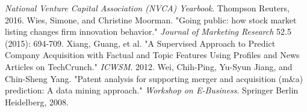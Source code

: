 \documentclass[12pt, a4paper]{article}
\begin{document}
\begin{thebibliography}{9}
 {\em National Venture Capital Association (NVCA) Yearbook}. Thompson Reuters, 2016.
 Wies, Simone, and Christine Moorman. {"Going public: how stock market listing changes firm innovation behavior."} {\em Journal of Marketing Research} 52.5 (2015): 694-709.
 Xiang, Guang, et al. {"A Supervised Approach to Predict Company Acquisition with Factual and Topic Features Using Profiles and News Articles on TechCrunch."} {\em ICWSM}. 2012.
 Wei, Chih-Ping, Yu-Syun Jiang, and Chin-Sheng Yang. {"Patent analysis for supporting merger and acquisition (m&a) prediction: A data mining approach."} {\em Workshop on E-Business}. Springer Berlin Heidelberg, 2008.
\end{thebibliography}
\end{document}
